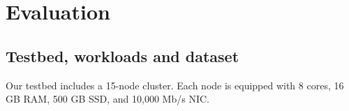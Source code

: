 \section{ Evaluation}
\label{sec:Evaluation}


\subsection{Testbed, workloads and dataset}

Our testbed includes 
a 15-node cluster.
Each node is equipped with 8 cores, 16 GB RAM, 500 GB SSD, and 10,000 Mb/s NIC. 


